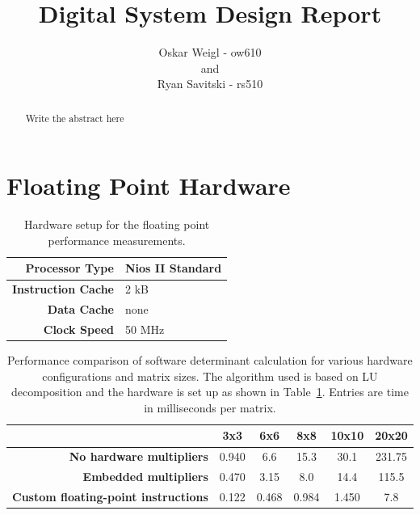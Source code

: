 \documentclass[]{article}
\title{Digital System Design Report}
\author{Oskar Weigl - ow610\\ and \\ Ryan Savitski - rs510}
\begin{document}
\maketitle

\begin{abstract}
	Write the abstract here
\end{abstract}

\tableofcontents
\clearpage



\section{Floating Point Hardware} %
\label{sec:floating_point_hardware}


\begin{table}[tbp]
	\caption{Hardware setup for the floating point performance measurements.}
	\label{tab:fp_hw_setup}
	\begin{center}
		\begin{tabular}{r|l}
		\hline

		\hline
			\textbf{Processor Type} 	& Nios II Standard \\
		\hline
			\textbf{Instruction Cache}	& 2 kB \\
		\hline
			\textbf{Data Cache}			& none \\
		\hline
			\textbf{Clock Speed}		& 50 MHz \\
		\hline

		\hline
		\end{tabular}
	\end{center}
\end{table}


\begin{table}[tbp]
	\caption{Performance comparison of software determinant calculation for various hardware configurations and matrix sizes. The algorithm used is based on LU decomposition and the hardware is set up as shown in Table~\ref{tab:fp_hw_setup}. Entries are time in milliseconds per matrix.}
	\label{tab:sw_perf}
	\begin{center}
		\begin{tabular}{r|ccccc}
		\hline

		\hline
			& \textbf{3x3}	& \textbf{6x6}	& \textbf{8x8}	& \textbf{10x10}	& \textbf{20x20} \\ 
		\hline
			\textbf{No hardware multipliers}
			& 0.940			& 6.6			& 15.3			& 30.1				& 231.75 \\
		\hline
			\textbf{Embedded multipliers}
			& 0.470			& 3.15			& 8.0			& 14.4				& 115.5 \\
		\hline
			\textbf{Custom floating-point instructions}
			& 0.122			& 0.468			& 0.984			& 1.450				& 7.8 \\
		\hline

		\hline
		\end{tabular}
	\end{center}
\end{table}
\end{document}

